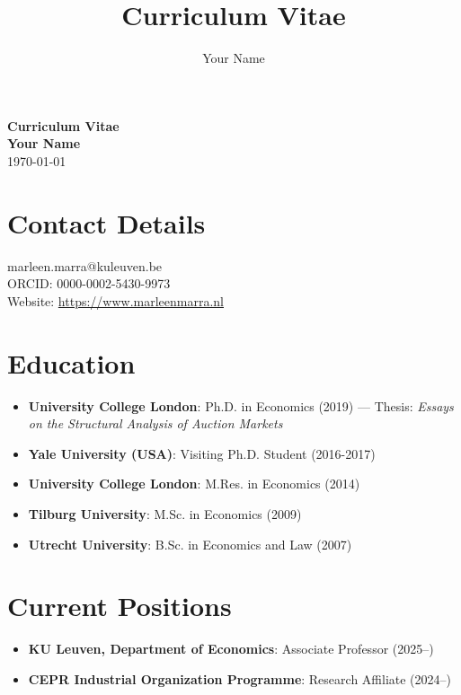 \documentclass[11pt,a4paper]{article}
\title{Curriculum Vitae}
\author{Your Name}
\date{}
\begin{document}
\begin{center}
{\Large \textbf{Curriculum Vitae}}\\[0.2cm]
{\large \textbf{Your Name}}\\[0.1cm]
{\small \today}
\end{center}

\vspace{0.3cm}

\section*{Contact Details}
\noindent
marleen.marra@kuleuven.be \\
ORCID: 0000-0002-5430-9973 \\
Website: \url{https://www.marleenmarra.nl}

\section*{Education}
\begin{itemize}
\renewcommand{\labelitemi}{\fontsize{4}{4}\selectfont$\blacksquare$}
\item \textbf{University College London}: Ph.D. in Economics (2019) --- Thesis: \emph{Essays on the Structural Analysis of Auction Markets} \vspace{0.1cm}
\item \textbf{Yale University (USA)}: Visiting Ph.D. Student (2016-2017) \vspace{0.1cm}
\item \textbf{University College London}: M.Res. in Economics (2014) \vspace{0.1cm}
\item \textbf{Tilburg University}: M.Sc. in Economics (2009) \vspace{0.1cm}
\item \textbf{Utrecht University}: B.Sc. in Economics and Law (2007) \vspace{0.1cm}
\end{itemize}


\section*{Current Positions}
\begin{itemize}
\renewcommand{\labelitemi}{\fontsize{4}{4}\selectfont$\blacksquare$}
\item \textbf{KU Leuven, Department of Economics}: Associate Professor (2025--) \vspace{0.1cm}
\item \textbf{CEPR Industrial Organization Programme}: Research Affiliate (2024--) \vspace{0.1cm}
\end{itemize}
\end{document}
